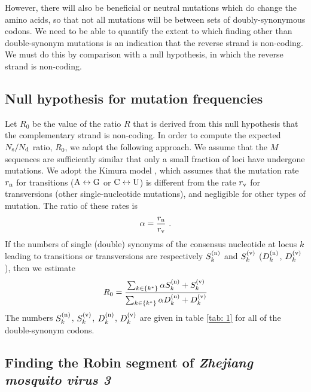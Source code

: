 \documentclass[unnumsec,webpdf,contemporary,large,namedate]{oup-authoring-template}%
\theoremstyle{thmstyleone}%
\theoremstyle{thmstyletwo}%
\theoremstyle{thmstylethree}%
\begin{document}
However, there will also be beneficial
or neutral mutations which do change the amino acids, so that not all mutations
will be between sets of doubly-synonymous codons. We need to be able to
quantify the extent to which finding other than double-synonym mutations is
an indication that the reverse strand is non-coding. We must do this by comparison with
a null hypothesis, in which the reverse strand is non-coding.

\subsection{Null hypothesis for mutation frequencies}
\label{sec: 4.3}

Let $R_0$ be the value of the ratio $R$ that is derived from this null hypothesis that
the complementary strand is non-coding.
In order to compute the expected $N_{\rm s}/N_{\rm d}$ ratio, $R_0$, we adopt the following
approach. We assume that the $M$ sequences are sufficiently similar
that only a small fraction of loci have undergone mutations.
We adopt the Kimura model \citep{Kim80}, which assumes that the mutation
rate $r_{\rm n}$ for transitions (${\rm A}\leftrightarrow {\rm G}$ or ${\rm C}\leftrightarrow{\rm U}$) 
is different from the rate $r_{\rm v}$ for transversions (other single-nucleotide mutations), and negligible for
other types of mutation. The ratio of these rates is
%
\begin{equation}
\label{eq: 6.6}
\alpha=\frac{r_{\rm n}}{r_{\rm v}}
\ .
\end{equation}
%
If the numbers of single (double) synonyms of the consensus nucleotide at locus $k$ leading to
transitions or transversions are respectively $S^{({\rm n})}_k$ and $S^{({\rm v})}_k$
($D^{({\rm n})}_k$, $D^{({\rm v})}_k$), then we estimate
%
\begin{equation}
\label{eq: 4.7}
R_0=
\frac{\sum_{k\in\{k^\ast\}}\alpha S_k^{({\rm n})}+S^{({\rm v})}_k}
{\sum_{k\in\{k^\ast\}}\alpha D^{({\rm n})}_k+D_k^{({\rm v})}}
\end{equation}
%
The numbers $S^{({\rm n})}_k$, $S^{({\rm v})}_k$, $D^{({\rm n})}_k$, $D^{({\rm v})}_k$ are given
in table \ref{tab: 1} for all of the double-synonym codons.

\subsection{Finding the Robin segment of \emph{Zhejiang mosquito virus 3}}
\label{sec: 4.4}
\end{document}

